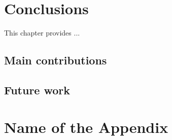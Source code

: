 \documentclass[12pt,english]{book}
\begin{document}
\chapter{Conclusions\label{cha:conclusions}}

This chapter provides ...

\section{Main contributions}

\section{Future work}

\appendix

\chapter{Name of the Appendix}

\cleardoublepage


\cleardoublepage



\end{document}
